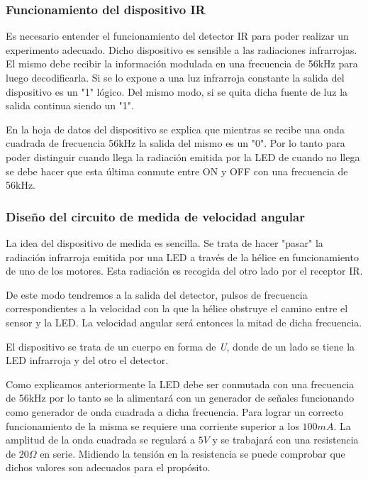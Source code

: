 \documentclass[spanish,12pt,a4paper,titlepage]{report}
\begin{document}
\subsubsection*{Funcionamiento del dispositivo IR}
Es necesario entender el funcionamiento del detector IR para poder realizar un experimento adecuado. Dicho dispositivo es sensible a las radiaciones infrarrojas. El mismo debe recibir la información modulada en una frecuencia de 56kHz para luego decodificarla. Si se lo expone a una luz infrarroja constante la salida del dispositivo es un "1" lógico. Del mismo modo, si se quita dicha fuente de luz la salida continua siendo un "1". 

En la hoja de datos del dispositivo se explica que mientras se recibe una onda cuadrada de frecuencia 56kHz la salida del mismo es un "0". Por lo tanto para poder distinguir cuando llega la radiación emitida por la LED de cuando no llega se debe hacer que esta última conmute entre ON y OFF con una frecuencia de 56kHz.

\subsubsection*{Diseño del circuito de medida de velocidad angular}

La idea del dispositivo de medida es sencilla. Se trata de hacer "pasar" la radiación infrarroja emitida por una LED a través de la hélice en funcionamiento de uno de los motores. Esta radiación es recogida del otro lado por el receptor IR.

De este modo tendremos a la salida del detector, pulsos de frecuencia correspondientes a la velocidad con la que la hélice obstruye el camino entre el sensor y la LED. La velocidad angular será entonces la mitad de dicha frecuencia. 

El dispositivo se trata de un cuerpo en forma de \textit{U}, donde de un lado se tiene la LED infrarroja y del otro el detector.

Como explicamos anteriormente la LED debe ser conmutada con una frecuencia de 56kHz por lo tanto se la alimentará con un generador de señales funcionando como generador de onda cuadrada a dicha frecuencia. Para lograr un correcto funcionamiento de la misma se requiere una corriente superior a los $100mA$. La amplitud de la onda cuadrada se regulará a $5V$ y se trabajará con una resistencia de $20\Omega$ en serie. Midiendo la tensión en la resistencia se puede comprobar que dichos valores son adecuados para el propósito.
\end{document}
